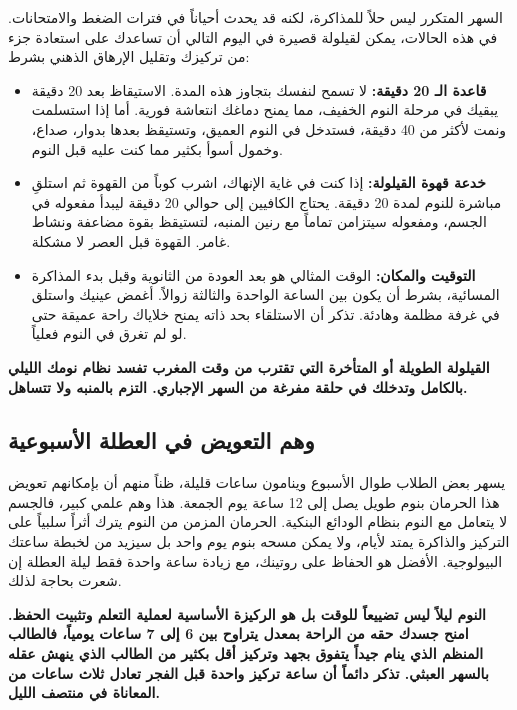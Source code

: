 \documentclass[12pt,a4paper]{book}
\newcommand{\importantAr}[1]{%
	\begin{important}
		\bfseries #1
	\end{important}
}
\begin{document}
السهر المتكرر ليس حلاً للمذاكرة، لكنه قد يحدث أحياناً في فترات الضغط والامتحانات. في هذه الحالات، يمكن لقيلولة قصيرة في اليوم التالي أن تساعدك على استعادة جزء من تركيزك وتقليل الإرهاق الذهني بشرط:

\begin{itemize}
	\item \textbf{قاعدة الـ 20 دقيقة:} لا تسمح لنفسك بتجاوز هذه المدة. الاستيقاظ بعد 20 دقيقة يبقيك في مرحلة النوم الخفيف، مما يمنح دماغك انتعاشة فورية. أما إذا استسلمت ونمت لأكثر من 40 دقيقة، فستدخل في النوم العميق، وتستيقظ بعدها بدوار، صداع، وخمول أسوأ بكثير مما كنت عليه قبل النوم.
	
	\item \textbf{خدعة قهوة القيلولة:} إذا كنت في غاية الإنهاك، اشرب كوباً من القهوة ثم استلقِ مباشرة للنوم لمدة 20 دقيقة. يحتاج الكافيين إلى حوالي 20 دقيقة ليبدأ مفعوله في الجسم، ومفعوله سيتزامن تماماً مع رنين المنبه، لتستيقظ بقوة مضاعفة ونشاط غامر. القهوة قبل العصر لا مشكلة.
	
	\item \textbf{التوقيت والمكان:} الوقت المثالي هو بعد العودة من الثانوية وقبل بدء المذاكرة المسائية، بشرط أن يكون بين الساعة الواحدة والثالثة زوالاً. أغمض عينيك واستلق في غرفة مظلمة وهادئة. تذكر أن الاستلقاء بحد ذاته يمنح خلاياك راحة عميقة حتى لو لم تغرق في النوم فعلياً.
\end{itemize}

\importantAr{القيلولة الطويلة أو المتأخرة التي تقترب من وقت المغرب تفسد نظام نومك الليلي بالكامل وتدخلك في حلقة مفرغة من السهر الإجباري. التزم بالمنبه ولا تتساهل.}


\subsection{وهم التعويض في العطلة الأسبوعية}

يسهر بعض الطلاب طوال الأسبوع وينامون ساعات قليلة، ظناً منهم أن بإمكانهم تعويض هذا الحرمان بنوم طويل يصل إلى 12 ساعة يوم الجمعة. هذا وهم علمي كبير، فالجسم لا يتعامل مع النوم بنظام الودائع البنكية. الحرمان المزمن من النوم يترك أثراً سلبياً على التركيز والذاكرة يمتد لأيام، ولا يمكن مسحه بنوم يوم واحد بل سيزيد من لخبطة ساعتك البيولوجية. الأفضل هو الحفاظ على روتينك، مع زيادة ساعة واحدة فقط ليلة العطلة إن شعرت بحاجة لذلك.

\importantAr{النوم ليلاً ليس تضييعاً للوقت بل هو الركيزة الأساسية لعملية التعلم وتثبيت الحفظ. امنح جسدك حقه من الراحة بمعدل يتراوح بين 6 إلى 7 ساعات يومياً، فالطالب المنظم الذي ينام جيداً يتفوق بجهد وتركيز أقل بكثير من الطالب الذي ينهش عقله بالسهر العبثي. تذكر دائماً أن ساعة تركيز واحدة قبل الفجر تعادل ثلاث ساعات من المعاناة في منتصف الليل.}
\end{document}
